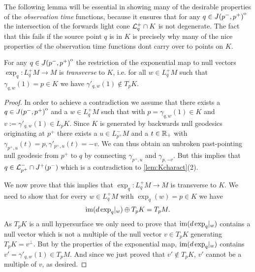 The following lemma will be essential in showing many of the desirable properties of the \emph{observation time} functions, because it ensures that for any $q\in {\kern0ptJ(p^-,p^+)}^{\mathrm{o}}$ the intersection of the forwards light cone ${\mathcal{L}}^+_{q}\cap K$ is not degenerate. The fact that this fails if the source point $q$ is in $K$ is precisely why many of the nice properties of the observation time functions dont carry over to points on $K$.
\begin{lemma}\label{lem:transversality}
For any $q\in {\kern0ptJ(p^-,p^+)}^{\mathrm{o}}$ the restriction of the exponential map to null vectors $\exp_q:L^+_qM\to M$ is \emph{transverse} to $K$, i.e. for all $w\in L^+_qM$ such that $\gamma_{q,w}(1) = p\in K$ we have $\gamma'_{q,w}(1)\notin T_pK$.
\end{lemma}
\begin{proof}
    In order to achieve a contradiction we assume that there exists a $q\in {\kern0ptJ(p^-,p^+)}^{\mathrm{o}}$ and a $w\in L^+_qM$ such that with $p=\gamma_{q,w}(1)\in K$ and $v:=\gamma'_{q,w}(1)\in L_pK$.
    Since $K$ is generated by backwards null geodesics originating at $p^+$ there exists a $u\in L^-_{p^+}M$ and a $t\in \mathbb{R}_+$ with $\gamma_{p^+,u}(t)=p, \gamma'_{p^+,u}(t)=-v$. We can thus obtain an unbroken past-pointing null geodesic from $p^+$ to $q$ by connecting $\gamma_{p^+,u}$ and $\gamma_{p,-v}$. But this implies that $q\in {\mathcal{L}}^-_{p^+}\cap J^+(p^-)$ which is a contradiction to \ref{lem:Kcharact}(2).

    We now prove that this implies that $\exp_q:L^+_qM\to M$ is transverse to $K$. We need to show that for every $w\in L^+_qM$ with $\exp_q(w)=p\in K$ we have 
    \[
        \operatorname{im}(d\exp_q\rvert_w) \oplus T_pK = T_pM.
    \]
    As $T_pK$ is a null hypersurface we only need to prove that $\operatorname{im}(d\exp_q\rvert_w)$ contains a null vector which is not a multiple of the null vector $v\in T_pK$ generating $T_pK = v^\perp$. But by the properties of the exponential map, $\operatorname{im}(d\exp_q\rvert_w)$ contains $v' = \gamma'_{q,w}(1) \in T_pM$. And since we just proved that $v'\notin T_pK$, $v'$ cannot be a multiple of $v$, as desired.
\end{proof}

